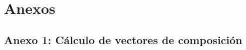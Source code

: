 \documentclass[12pt]{article}
\begin{document}
\newpage

\clearpage 
\section{Anexos}
\subsection{Anexo 1: Cálculo de vectores de composición}

\clearpage
\singlespacing %
\end{document}
